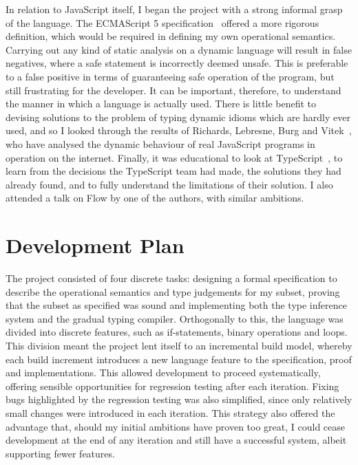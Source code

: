 \documentclass[12pt,a4paper,twoside,openright]{report}
\begin{document}
In relation to JavaScript itself, I began the project with a strong informal
grasp of the language. The ECMAScript 5 specification~\cite{ecmaSpec} offered a
more rigorous definition, which would be required in defining my own
operational semantics. Carrying out any kind of static analysis on a dynamic
language will result in false negatives, where a safe statement is incorrectly
deemed unsafe. This is preferable to a false positive in terms of guaranteeing
safe operation of the program, but still frustrating for the developer. It can
be important, therefore, to understand the manner in which a language is
actually used. There is little benefit to devising solutions to the problem of
typing dynamic idioms which are hardly ever used, and so I looked through the
results of Richards, Lebresne, Burg and Vitek~\cite{JSBehaviour}, who have
analysed the dynamic behaviour of real JavaScript programs in operation on the
internet.  Finally, it was educational to look at
TypeScript~\cite{ts,understandingTS}, to learn from the decisions the
TypeScript team had made, the solutions they had already found, and to fully
understand the limitations of their solution. I also attended a talk on Flow by
one of the authors, with similar ambitions.

\section{Development Plan}

The project consisted of four discrete tasks: designing a formal specification
to describe the operational semantics and type judgements for my subset,
proving that the subset as specified was sound and implementing both the type
inference system and the gradual typing compiler. Orthogonally to this, the
language was divided into discrete features, such as if-statements, binary
operations and loops. This division meant the project lent itself to an
incremental build model, whereby each build increment introduces a new language
feature to the specification, proof and implementations. This allowed
development to proceed systematically, offering sensible opportunities for
regression testing after each iteration. Fixing bugs highlighted by the
regression testing was also simplified, since only relatively small changes
were introduced in each iteration. This strategy also offered the advantage
that, should my initial ambitions have proven too great, I could cease
development at the end of any iteration and still have a successful system,
albeit supporting fewer features.
\end{document}
